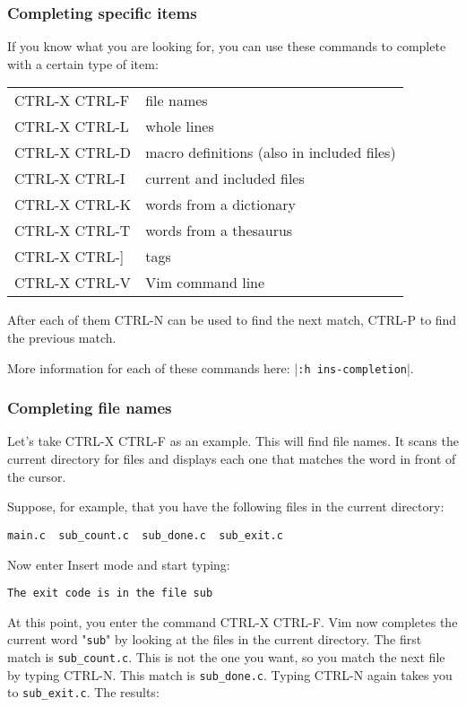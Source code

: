 \subsubsection{Completing specific items}
If you know what you are looking for, you can use these commands to complete with a certain type of item:
\begin{center} \begin{tabular}{l l}
				CTRL-X CTRL-F & file names \\
				CTRL-X CTRL-L & whole lines \\
				CTRL-X CTRL-D & macro definitions (also in included files) \\
				CTRL-X CTRL-I & current and included files \\
				CTRL-X CTRL-K & words from a dictionary \\
				CTRL-X CTRL-T & words from a thesaurus \\
				CTRL-X CTRL-] & tags \\
				CTRL-X CTRL-V & Vim command line \\
\end{tabular} \end{center}
After each of them CTRL-N can be used to find the next match, CTRL-P to find the previous match.

More information for each of these commands here: |\verb!:h ins-completion!|.
\subsubsection{Completing file names}
Let's take CTRL-X CTRL-F as an example.
This will find file names.
It scans the current directory for files and displays each one that matches the word in front of the cursor.

Suppose, for example, that you have the following files in the current directory:

\begin{Verbatim}[samepage=true]
    main.c  sub_count.c  sub_done.c  sub_exit.c
\end{Verbatim}

Now enter Insert mode and start typing:

\begin{Verbatim}[samepage=true]
    The exit code is in the file sub 
\end{Verbatim}

At this point, you enter the command CTRL-X CTRL-F.
Vim now completes the current word "\verb!sub!" by looking at the files in the current directory.
The first match is \verb!sub_count.c!.
This is not the one you want, so you match the next file by typing CTRL-N.
This match is \verb!sub_done.c!.
Typing CTRL-N again takes you to \verb!sub_exit.c!.
The results:

